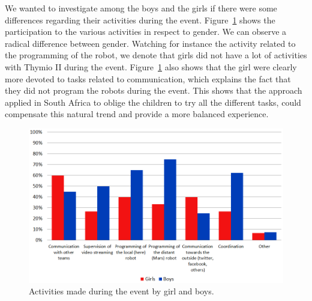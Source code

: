 \documentclass{intech-journal}
\begin{document}
We wanted to investigate among the boys and the girls if there were some differences regarding their activities during the event.
Figure~\ref{fig:activities} shows the participation to the various activities in respect to gender. 
We can observe a radical difference between gender. 
Watching for instance the activity related to the programming of the robot, we denote that girls did not have a lot of activities with Thymio II during the event. 
Figure~\ref{fig:activities} also shows that the girl were clearly more devoted to tasks related to communication, which explains the fact that they did not program the robots during the event. 
This shows that the approach applied in South Africa to oblige the children to try all the different tasks, could compensate this natural trend and provide a more balanced experience.

\begin{figure}[ht]
 \centering
    \includegraphics[width=0.7\columnwidth]{figures/activities.png}
  \caption{Activities made during the event by girl and boys.}
  \label{fig:activities} 
\end{figure}
\end{document}
